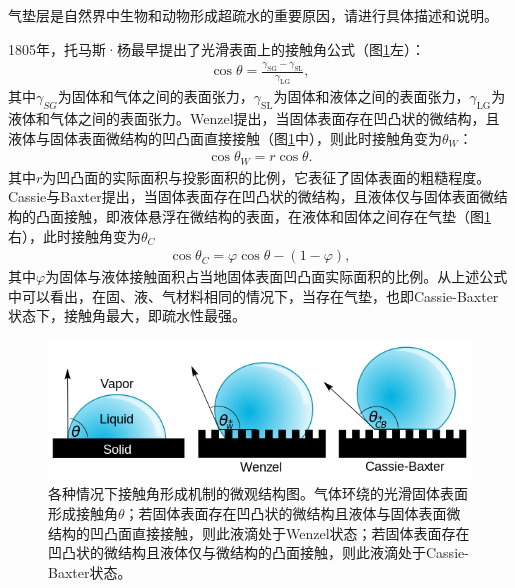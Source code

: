 \documentclass{assignment}
\begin{document}
\begin{ti}
    气垫层是自然界中生物和动物形成超疏水的重要原因，请进行具体描述和说明。
\end{ti}
\begin{da}
    1805年，托马斯·杨最早提出了光滑表面上的接触角公式（图\ref{Contact-angle-microstates}左）：
    \begin{align}
        \cos\theta=\frac{\gamma_{\text{SG}}-\gamma_{\text{SL}}}{\gamma_{\text{LG}}},
    \end{align}
    其中$\gamma_{SG}$为固体和气体之间的表面张力，$\gamma_{\text{SL}}$为固体和液体之间的表面张力，$\gamma_{\text{LG}}$为液体和气体之间的表面张力。Wenzel提出，当固体表面存在凹凸状的微结构，且液体与固体表面微结构的凹凸面直接接触（图\ref{Contact-angle-microstates}中），则此时接触角变为$\theta_W$：
    \begin{align}
        \cos\theta_W=r\cos\theta.
    \end{align}
    其中$r$为凹凸面的实际面积与投影面积的比例，它表征了固体表面的粗糙程度。Cassie与Baxter提出，当固体表面存在凹凸状的微结构，且液体仅与固体表面微结构的凸面接触，即液体悬浮在微结构的表面，在液体和固体之间存在气垫（图\ref{Contact-angle-microstates}右），此时接触角变为$\theta_C$
    \begin{align}
        \cos\theta_C=\varphi\cos\theta-(1-\varphi),
    \end{align}
    其中$\varphi$为固体与液体接触面积占当地固体表面凹凸面实际面积的比例。从上述公式中可以看出，在固、液、气材料相同的情况下，当存在气垫，也即Cassie-Baxter状态下，接触角最大，即疏水性最强。
    \begin{figure}[H]
        \centering
        \includegraphics[width=.5\columnwidth]{Contact-angle-microstates.png}
        \caption{各种情况下接触角形成机制的微观结构图。气体环绕的光滑固体表面形成接触角$\theta$；若固体表面存在凹凸状的微结构且液体与固体表面微结构的凹凸面直接接触，则此液滴处于Wenzel状态；若固体表面存在凹凸状的微结构且液体仅与微结构的凸面接触，则此液滴处于Cassie-Baxter状态。}
        \label{Contact-angle-microstates}
    \end{figure}


\end{da}
\end{document}
